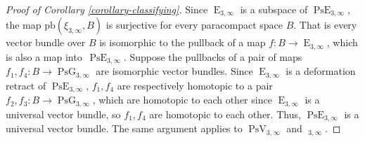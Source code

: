 \documentclass[11pt]{article}
\numberwithin{equation}{section}
\theoremstyle{remark}
\DeclareMathOperator{\pg}{PsG}
\DeclareMathOperator{\pe}{PsE}
\DeclareMathOperator{\e}{E}
\DeclareMathOperator{\poe}{Ps\widetilde{E}}
\DeclareMathOperator{\pstief}{PsV}
\begin{document}
\begin{proof}[Proof of Corollary \ref{corollary-classifying}]
Since $\e_{3,\infty}$ is a subspace of $\pe_{3,\infty}$, the map $\text{pb}(\xi_{3,\infty},B)$ is surjective for every paracompact space $B$. That is every vector bundle over $B$ is isomorphic to the pullback of a map $f : B \to \e_{3,\infty}$, which is also a map into~$\pe_{3,\infty}$.
Suppose the pullbacks of a pair of maps $f_1,f_4 : B \to \pg_{3,\infty}$ are isomorphic vector bundles.
Since $\e_{3,\infty}$ is a deformation retract of $\pe_{3,\infty}$, $f_1,f_4$ are respectively homotopic to a pair $f_2,f_3 : B \to \pg_{3,\infty}$, which are homotopic to each other since $\e_{3,\infty}$ is a universal vector bundle, so $f_1,f_4$ are homotopic to each other.
Thus, $\pe_{3,\infty}$ is a universal vector bundle.
The same argument applies to $\pstief_{3,\infty}$ and $\poe_{3,\infty}$.
\end{proof}


\end{document}
